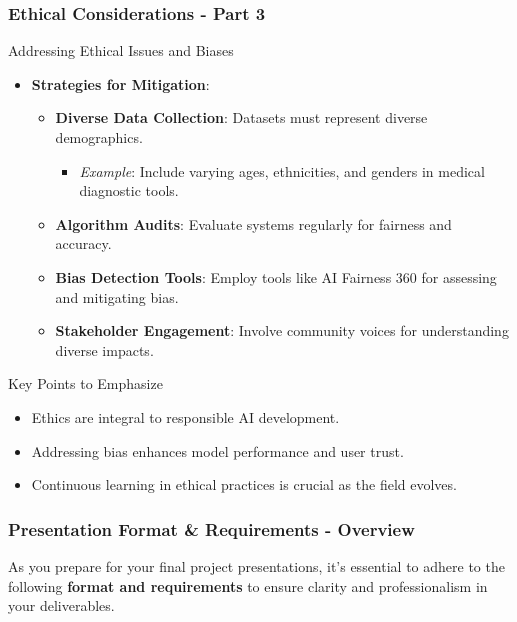 \documentclass[aspectratio=169]{beamer}
\begin{document}
\begin{frame}[fragile]
    \frametitle{Ethical Considerations - Part 3}
    \begin{block}{Addressing Ethical Issues and Biases}
        \begin{itemize}
            \item \textbf{Strategies for Mitigation}:
            \begin{itemize}
                \item \textbf{Diverse Data Collection}: Datasets must represent diverse demographics.
                    \begin{itemize}
                        \item \textit{Example}: Include varying ages, ethnicities, and genders in medical diagnostic tools.
                    \end{itemize}
                \item \textbf{Algorithm Audits}: Evaluate systems regularly for fairness and accuracy.
                \item \textbf{Bias Detection Tools}: Employ tools like AI Fairness 360 for assessing and mitigating bias.
                \item \textbf{Stakeholder Engagement}: Involve community voices for understanding diverse impacts.
            \end{itemize}
        \end{itemize}
    \end{block}
    
    \begin{block}{Key Points to Emphasize}
        \begin{itemize}
            \item Ethics are integral to responsible AI development.
            \item Addressing bias enhances model performance and user trust.
            \item Continuous learning in ethical practices is crucial as the field evolves.
        \end{itemize}
    \end{block}
\end{frame}

\begin{frame}[fragile]
    \frametitle{Presentation Format \& Requirements - Overview}
    As you prepare for your final project presentations, it's essential to adhere to the following \textbf{format and requirements} to ensure clarity and professionalism in your deliverables.
\end{frame}
\end{document}
